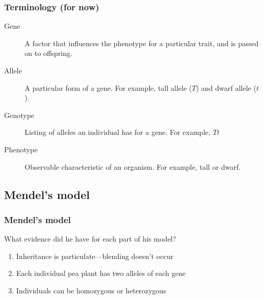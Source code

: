 \begin{frame}
    \frametitle{Terminology (for now)}
    \begin{description}
        \item[Gene] A factor that influences the phenotype for a
                particular trait, and is passed on to offspring.
        \item[Allele] A particular form of a gene. For example, tall allele
            ($T$) and dwarf allele ($t$).
        \item[Genotype] Listing of alleles an individual has for a gene.
            For example, $Tt$
        \item[Phenotype] Observable characteristic of an organism.
            For example, tall or dwarf.
    \end{description}
\end{frame}

\subsection{Mendel's model}

\begin{frame}[t]
    \frametitle{Mendel's model}
    What evidence did he have for each part of his model?

    \begin{enumerate}
        \item Inheritance is particulate---blending doesn't occur
            \vspace{1.5ex}
        \item Each individual pea plant has two alleles of each gene
            \vspace{1.5ex}
        \item Individuals can be homozygous or heterozygous
    \end{enumerate}
\end{frame}

